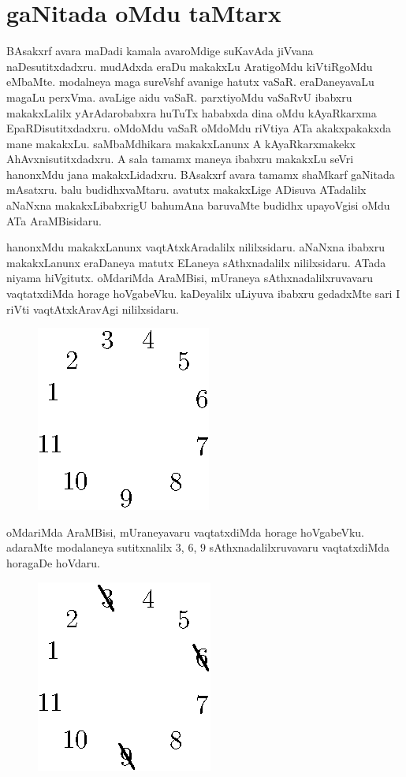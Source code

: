 \chapter{gaNitada oMdu taMtarx}


BAsakxrf avara maDadi kamala avaroMdige suKavAda jiVvana naDesutitxdadxru. mudAdxda eraDu makakxLu AratigoMdu kiVtiRgoMdu eMbaMte. modalneya maga sureVshf avanige hatutx vaSaR. eraDaneyavaLu magaLu perxVma. avaLige aidu vaSaR. parxtiyoMdu vaSaRvU ibabxru makakxLalilx yArAdarobabxra huTuTx hababxda dina oMdu kAyaRkarxma EpaRDisutitxdadxru. oMdoMdu vaSaR oMdoMdu riVtiya ATa akakxpakakxda mane makakxLu. saMbaMdhikara makakxLanunx A kAyaRkarxmakekx AhAvxnisutitxdadxru. A sala tamamx maneya ibabxru makakxLu seVri hanonxMdu jana makakxLidadxru. BAsakxrf avara tamamx shaMkarf gaNitada mAsatxru. balu budidhxvaMtaru. avatutx makakxLige ADisuva ATadalilx aNaNxna makakxLibabxrigU bahumAna baruvaMte budidhx upayoVgisi oMdu ATa AraMBisidaru.

hanonxMdu makakxLanunx vaqtAtxkAradalilx nililxsidaru. aNaNxna ibabxru makakxLanunx eraDaneya matutx ELaneya sAthxnadalilx nililxsidaru. ATada niyama hiVgitutx. oMdariMda AraMBisi, mUraneya sAthxnadalilxruvavaru vaqtatxdiMda horage hoVgabeVku. kaDeyalilx uLiyuva ibabxru gedadxMte sari I riVti vaqtAtxkAravAgi nililxsidaru.
\begin{figure}[H]
\centering
\includegraphics{src/figures/fig1.eps}
\end{figure}

oMdariMda AraMBisi, mUraneyavaru vaqtatxdiMda horage hoVgabeVku. adaraMte modalaneya sutitxnalilx $3$, $6$, $9$ sAthxnadalilxruvavaru vaqtatxdiMda horagaDe hoVdaru.
\begin{figure}[H]
\centering
\includegraphics{src/figures/fig2.eps}
\end{figure}

